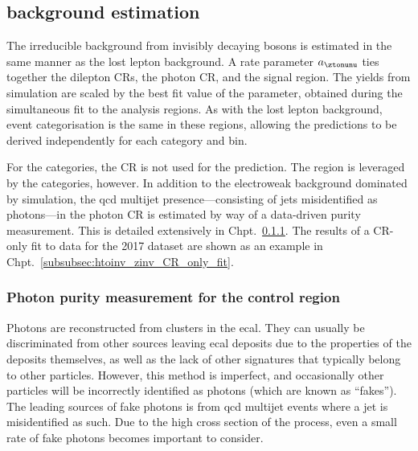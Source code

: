

\subsection{\texorpdfstring{\ztonunupjets}{Z to nunu + jets} background estimation}
\label{subsubsec:htoinv_znunu_bkg}

The irreducible background from invisibly decaying \PZ bosons is estimated in the same manner as the lost lepton background. A rate parameter $a_{\ztonunu}$ ties together the dilepton \glspl{CR}, the photon \gls{CR}, and the signal region. The yields from simulation are scaled by the best fit value of the parameter, obtained during the simultaneous fit to the analysis regions. As with the lost lepton background, event categorisation is the same in these regions, allowing the predictions to be derived independently for each category and \ptmiss bin.

For the \ttH categories, the \singlePhotonCr \gls{CR} is not used for the \ztonunu prediction. The region is leveraged by the \VH categories, however. In addition to the electroweak background dominated by \gammapjets simulation, the \acrshort{qcd} multijet presence---consisting of \glspl{jet} misidentified as photons---in the photon \gls{CR} is estimated by way of a data-driven purity measurement. This is detailed extensively in Chpt.~\ref{subsubsec:htoinv_photon_purity}. The results of a \gls{CR}-only fit to data for the 2017 dataset are shown as an example in Chpt.~\ref{subsubsec:htoinv_zinv_CR_only_fit}.




\subsubsection{Photon purity measurement for the \texorpdfstring{\singlePhotonCr}{photon} control region}
\label{subsubsec:htoinv_photon_purity}

Photons are reconstructed from clusters in the \acrshort{ecal}. They can usually be discriminated from other sources leaving \acrshort{ecal} deposits due to the properties of the deposits themselves, as well as the lack of other signatures that typically belong to other particles. However, this method is imperfect, and occasionally other particles will be incorrectly identified as photons (which are known as ``fakes''). The leading sources of fake photons is from \acrshort{qcd} multijet events where a \gls{jet} is misidentified as such. Due to the high cross section of the process, even a small rate of fake photons becomes important to consider.


